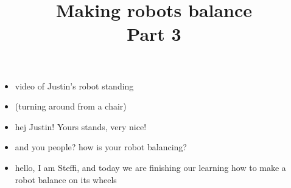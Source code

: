 \newif	\ifexternalize					%
\newif	\ifshowonlynotes				%
\newif	\ifhandout						%
\newif	\ifshowsolutions				%
\newif	\ifshownotes					%
\ifdefined\EXTERNALIZE	\externalizetrue	\fi						%
\ifdefined\ONLYNOTES	\showonlynotestrue	\fi						%
\ifdefined\HANDOUT		\handouttrue		\fi						%
\ifdefined\SOLUTIONS	\showsolutionstrue	\fi						%
\ifdefined\NOTES		\shownotestrue		\fi						%
\title		[Balancing Robots]	{Making robots balance \\ Part 3}	%
\date		{} %




\begin{frame}
	\begin{itemize}
		\item video of Justin's robot standing
	\end{itemize}
\end{frame}


\begin{frame}
	\begin{itemize}
		\item (turning around from a chair)
		\item hej Justin! Yours stands, very nice!
		\item and you people? how is your robot balancing?
		\item hello, I am Steffi, and today we are finishing our learning how to make a robot balance on its wheels
	\end{itemize}
\end{frame}


